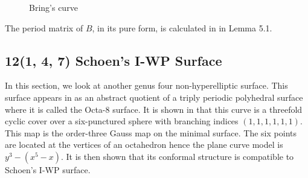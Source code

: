 \documentclass[12pt,reqno]{amsart}
\theoremstyle{definition}
\theoremstyle{remark}
\begin{document}
\begin{figure}[htbp]
    \centering
    \qquad
   \qquad
    \caption{Bring's curve}%
    \label{fig:1331}%
\end{figure}



The period matrix of $B$, in its pure form, is calculated in \cite{matti} in Lemma 5.1. %


\subsection*{12(1, 4, 7) Schoen's I-WP Surface}


In this section, we look at another genus four non-hyperelliptic surface. This surface appears in \cite{dthesis} as an abstract quotient of a triply periodic polyhedral surface where it is called the Octa-8 surface. It is shown in \cite{dthesis} that this curve is a threefold cyclic cover over a six-punctured sphere with branching indices $(1, 1, 1, 1, 1, 1).$ This map is the order-three Gauss map on the minimal surface. The six points are located at the vertices of an octahedron hence the plane curve model is $y^3 - (x^5 - x).$ It is then shown that its conformal structure is compatible to Schoen's I-WP surface.
\end{document}
